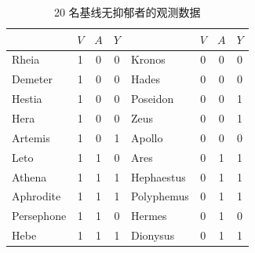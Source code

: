\begin{table}[htbp]
\centering
\caption{20 名基线无抑郁者的观测数据}
\label{tab:4.4}
\small
\renewcommand{\arraystretch}{1.0}
\begin{tabular}{lccc@{\hspace{1.8em}}lccc}
\toprule
 & $V$ & $A$ & $Y$ & & $V$ & $A$ & $Y$\\
\midrule
Rheia      & 1 & 0 & 0 & Kronos     & 0 & 0 & 0\\
Demeter    & 1 & 0 & 0 & Hades      & 0 & 0 & 0\\
Hestia     & 1 & 0 & 0 & Poseidon   & 0 & 0 & 1\\
Hera       & 1 & 0 & 0 & Zeus       & 0 & 0 & 1\\
Artemis    & 1 & 0 & 1 & Apollo     & 0 & 0 & 0\\
Leto       & 1 & 1 & 0 & Ares       & 0 & 1 & 1\\
Athena     & 1 & 1 & 1 & Hephaestus & 0 & 1 & 1\\
Aphrodite  & 1 & 1 & 1 & Polyphemus & 0 & 1 & 1\\
Persephone & 1 & 1 & 0 & Hermes     & 0 & 1 & 0\\
Hebe       & 1 & 1 & 1 & Dionysus   & 0 & 1 & 1\\
\bottomrule
\end{tabular}
\end{table}

